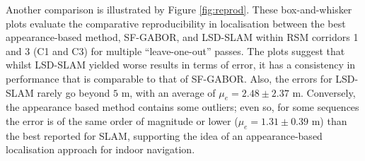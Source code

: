 Another comparison is illustrated by Figure \ref{fig:reprod}. These box-and-whisker plots evaluate the comparative reproducibility in localisation between the best appearance-based method, SF-GABOR, and LSD-SLAM within RSM corridors 1 and 3 (C1 and C3) for multiple ``leave-one-out'' passes. The plots suggest that whilst LSD-SLAM yielded worse results in terms of error, it has a consistency in performance that is comparable to that of SF-GABOR. Also, the errors for LSD-SLAM rarely go beyond $5$ m, with an average of $\mu_e = 2.48 \pm 2.37$ m. Conversely, the appearance based method contains some outliers; even so, for some sequences the error is of the same order of magnitude or lower ($\mu_e = 1.31 \pm 0.39$ m) than the best reported for SLAM, supporting the idea of an appearance-based localisation approach for indoor navigation. 

